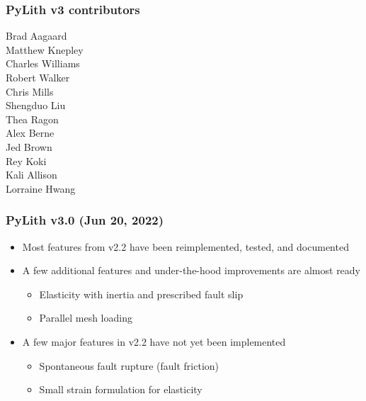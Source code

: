 \documentclass[aspectratio=169]{beamer}
\begin{document}
\begin{frame}
  \frametitle{PyLith v3 contributors}

Brad Aagaard \\
Matthew Knepley \\
Charles Williams \\
Robert Walker \\
Chris Mills \\
Shengduo Liu \\
Thea Ragon \\
Alex Berne \\
Jed Brown \\
Rey Koki \\
Kali Allison \\
Lorraine Hwang

  
\end{frame}


\begin{frame}
  \frametitle{PyLith v3.0 (Jun 20, 2022)}
  \summary{}

  \begin{itemize}
  \item Most features from v2.2 have been reimplemented, tested, and documented
  \item A few additional features and under-the-hood improvements are almost ready
    \begin{itemize}
    \item Elasticity with inertia and prescribed fault slip
    \item Parallel mesh loading
    \end{itemize}
  \item A few major features in v2.2 have not yet been implemented
    \begin{itemize}
    \item Spontaneous fault rupture (fault friction)
    \item Small strain formulation for elasticity
    \end{itemize}    
  \end{itemize}

\end{frame}
\end{document}
